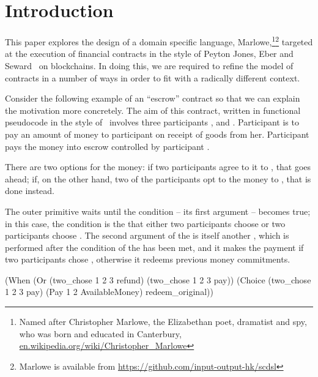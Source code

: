 \documentclass[runningheads]{llncs}
\begin{document}
\section{Introduction}
\label{sec:intro}


This paper explores the design of a domain specific language, Marlowe,\footnote{Named after Christopher 
Marlowe, the Elizabethan poet, dramatist and spy, who was born and educated in Canterbury,  
\url{en.wikipedia.org/wiki/Christopher_Marlowe}}\footnote{Marlowe is available from 
\url{https://github.com/input-output-hk/scdsl}} targeted at the execution of financial contracts in the style of 
Peyton Jones, Eber and Seward~\cite{PeytonJones:2000} on blockchains. In doing this, we are required to refine the 
model of contracts in a number of ways in order to fit with a radically different context. 

Consider the following example of an ``escrow'' contract so that we can explain the motivation 
more concretely. The aim of this contract, written in functional pseudocode in the style of~\cite{PeytonJones:2000} 
involves three participants ,  and . Participant  is 
to pay an amount of money to participant  on receipt of goods from her. Participant  
pays the money into escrow controlled by participant .

There are two options for the money: if two participants agree to  it to , that goes 
ahead; if, on the other hand, two of the participants opt to  the money to , that 
is done instead.

The outer primitive  waits until the condition -- its first argument -- 
becomes true; in this case, the condition is the that either two participants choose  or two 
participants choose . The second argument of the  is itself another 
, which is performed after the condition of the  has been met, and it makes 
the payment if two participants chose , otherwise it redeems previous money commitments.

\begin{haskellcode}
(When (Or (two_chose 1 2 3 refund)
          (two_chose 1 2 3 pay))
      (Choice (two_chose 1 2 3 pay)
              (Pay 1 2 AvailableMoney)
              redeem_original))
\end{haskellcode}
\end{document}
